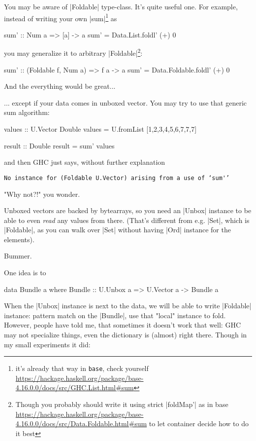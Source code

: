 You may be aware of |Foldable| type-class.
It's quite useful one. For example, instead of writing your own |sum|\footnote{it's already that way in \texttt{base}, check yourself \url{https://hackage.haskell.org/package/base-4.16.0.0/docs/src/GHC.List.html#sum}} as

\begin{code}
sum' :: Num a => [a] -> a
sum' = Data.List.foldl' (+) 0
\end{code}

you may generalize it to arbitrary |Foldable|\footnote{Though you probably should write it using strict |foldMap'| as in base \url{https://hackage.haskell.org/package/base-4.16.0.0/docs/src/Data.Foldable.html#sum} to let container decide how to do it best}:

\begin{code}
sum' :: (Foldable f, Num a) => f a -> a
sum' = Data.Foldable.foldl' (+) 0
\end{code}

And the everything would be great...

... except if your data comes in unboxed vector.
You may try to use that generic sum algorithm:

\begin{code}
values :: U.Vector Double
values = U.fromList [1,2,3,4,5,6,7,7,7]

result :: Double
result = sum' values
\end{code}

and then GHC just says, without further explanation

\begin{verbatim}
No instance for (Foldable U.Vector) arising from a use of ‘sum'’
\end{verbatim}

"Why not?!" you wonder.

Unboxed vectors are backed by bytearrays, so you need an |Unbox| instance
to be able to even \emph{read} any values from there.
(That's different from e.g. |Set|, which is |Foldable|, as you can walk over
 |Set| without having |Ord| instance for the elements).

Bummer.

One idea is to

\begin{code}
data Bundle a where
    Bundle :: U.Unbox a => U.Vector a -> Bundle a
\end{code}

When the |Unbox| instance is next to the data, we will be able to write |Foldable| instance:
pattern match on the |Bundle|, use that "local" instance to fold.
However, people have told me, that sometimes it doesn't work that well:
GHC may not specialize things, even the dictionary is (almost) right there.
Though in my small experiments it did:

